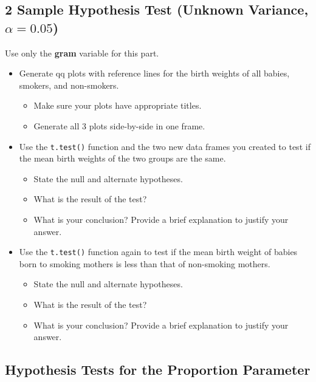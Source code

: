 \documentclass{article}
\begin{document}
\subsection*{2 Sample Hypothesis Test (Unknown Variance, $\alpha = 0.05$)}

Use only the \textbf{gram} variable for this part.

\begin{itemize}
    \item Generate qq plots with reference lines for the birth weights of all babies, smokers, and non-smokers.
    \begin{itemize}
        \item Make sure your plots have appropriate titles.
        \item Generate all 3 plots side-by-side in one frame.
    \end{itemize}

    \item Use the \texttt{t.test()} function and the two new data frames you created to test if the mean birth weights of the two groups are the same.
    \begin{itemize}
            \item State the null and alternate hypotheses.
    \item What is the result of the test?
    \item What is your conclusion? Provide a brief explanation to justify your answer.
    \end{itemize}

    \item Use the \texttt{t.test()} function again to test if the mean birth weight of babies born to smoking mothers is less than that of non-smoking mothers.
    \begin{itemize}
    \item State the null and alternate hypotheses.
    \item What is the result of the test?
    \item What is your conclusion? Provide a brief explanation to justify your answer.
    \end{itemize}

\end{itemize}

\subsection*{Hypothesis Tests for the Proportion Parameter}
\end{document}
